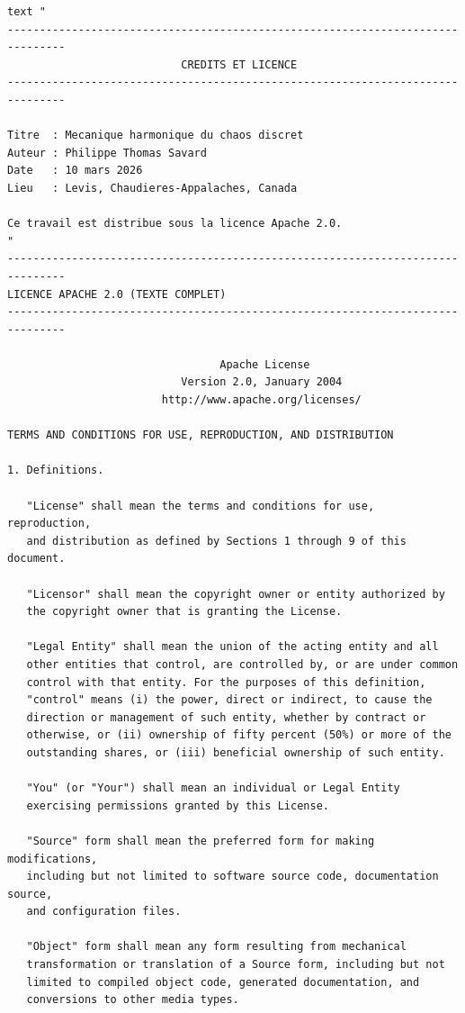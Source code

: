 \documentclass[12pt,a4paper]{article}
\theoremstyle{definition}
\theoremstyle{remark}
\begin{document}
\begin{verbatim}
text "
-------------------------------------------------------------------------------
                           CREDITS ET LICENCE
-------------------------------------------------------------------------------

Titre  : Mecanique harmonique du chaos discret
Auteur : Philippe Thomas Savard
Date   : 10 mars 2026
Lieu   : Levis, Chaudieres-Appalaches, Canada

Ce travail est distribue sous la licence Apache 2.0.
"
-------------------------------------------------------------------------------
LICENCE APACHE 2.0 (TEXTE COMPLET)
-------------------------------------------------------------------------------

                                 Apache License
                           Version 2.0, January 2004
                        http://www.apache.org/licenses/

TERMS AND CONDITIONS FOR USE, REPRODUCTION, AND DISTRIBUTION

1. Definitions.

   "License" shall mean the terms and conditions for use, reproduction,
   and distribution as defined by Sections 1 through 9 of this document.

   "Licensor" shall mean the copyright owner or entity authorized by
   the copyright owner that is granting the License.

   "Legal Entity" shall mean the union of the acting entity and all
   other entities that control, are controlled by, or are under common
   control with that entity. For the purposes of this definition,
   "control" means (i) the power, direct or indirect, to cause the
   direction or management of such entity, whether by contract or
   otherwise, or (ii) ownership of fifty percent (50%) or more of the
   outstanding shares, or (iii) beneficial ownership of such entity.

   "You" (or "Your") shall mean an individual or Legal Entity
   exercising permissions granted by this License.

   "Source" form shall mean the preferred form for making modifications,
   including but not limited to software source code, documentation source,
   and configuration files.

   "Object" form shall mean any form resulting from mechanical
   transformation or translation of a Source form, including but not
   limited to compiled object code, generated documentation, and
   conversions to other media types.


\end{verbatim}
\end{document}
